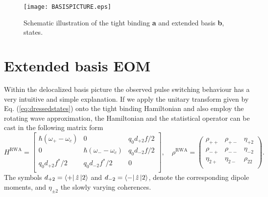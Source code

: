 \documentclass[]{spie}  %
\begin{document}
\begin{figure}[h!] \begin{center}
 		\texttt{[image: BASISPICTURE.eps]} \caption{ Schematic illustration
 			of the tight binding \textbf{a} and extended basis \textbf{b}, states.  }
 		\label{fig:basis_schemata} \end{center}	\end{figure} \section{Extended basis
 	EOM} Within the delocalized basis picture the observed pulse switching
behaviour has a very intuitive and simple explanation. If we apply the unitary
transform given by Eq. (\ref{eq:dressedstates}) onto the tight binding
Hamiltonian and also employ the rotating wave approximation, the Hamiltonian
and the statistical operator can be cast in the following matrix form
\begin{equation} H^{\text{RWA}} = \begin{bmatrix} \hbar (\omega_+-\omega_c) & 0
& q_0d_{+2}f/2 \\ 0 & \hbar (\omega_--\omega_c) & q_0d_{-2}f/2 \\
q_0d_{+2}f^*/2 & q_0d_{-2}f^*/2 & 0 \\ \end{bmatrix},\quad \rho^{\text{RWA}} =
\begin{pmatrix} \rho_{++} & \rho_{+-} & \eta_{+2} \\ \rho_{-+} & \rho_{--} &
\eta_{-2} \\ \eta_{2+} & \eta_{2-} & \rho_{22} \\ \end{pmatrix}.
\end{equation} The symbols $d_{+2} = \Bra{+}\hat{z}\Ket{2} $ and $d_{-2} =
\Bra{-}\hat{z}\Ket{2} $, denote the corresponding dipole moments, and $
\eta_{\pm 2}$ the slowly varying coherences. 
\end{document}
